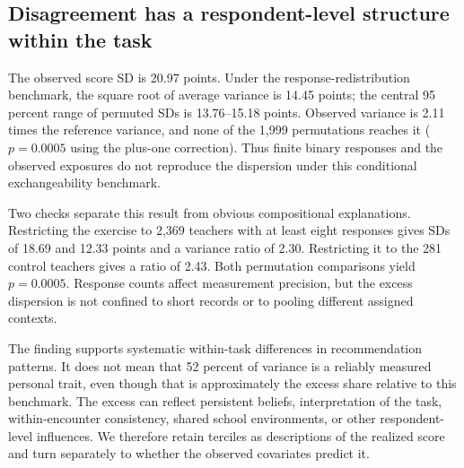 \subsection{Disagreement has a respondent-level structure within the task}
\begin{addition}
The observed score SD is 20.97 points. Under the response-redistribution benchmark, the square root of average variance is 14.45 points; the central 95 percent range of permuted SDs is 13.76--15.18 points. Observed variance is 2.11 times the reference variance, and none of the 1,999 permutations reaches it ($p=0.0005$ using the plus-one correction). Thus finite binary responses and the observed exposures do not reproduce the dispersion under this conditional exchangeability benchmark.
\end{addition}
\begin{addition}
Two checks separate this result from obvious compositional explanations. Restricting the exercise to 2,369 teachers with at least eight responses gives SDs of 18.69 and 12.33 points and a variance ratio of 2.30. Restricting it to the 281 control teachers gives a ratio of 2.43. Both permutation comparisons yield $p=0.0005$. Response counts affect measurement precision, but the excess dispersion is not confined to short records or to pooling different assigned contexts.

The finding supports systematic within-task differences in recommendation patterns. It does not mean that 52 percent of variance is a reliably measured personal trait, even though that is approximately the excess share relative to this benchmark. The excess can reflect persistent beliefs, interpretation of the task, within-encounter consistency, shared school environments, or other respondent-level influences. We therefore retain terciles as descriptions of the realized score and turn separately to whether the observed covariates predict it.
\end{addition}

